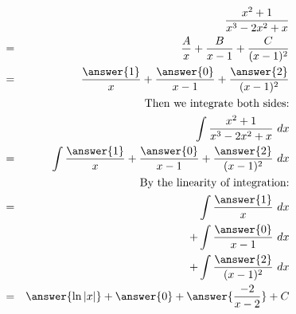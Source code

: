 \documentclass{ximera}
\begin{document}
\begin{explanation}
\begin{eqnarray*}
&&\frac{x^2+1}{x^3-2x^2+x}\\
&=& \frac{A}{x}+\frac{B}{x-1}+\frac{C}{(x-1)^2}\\
&=& \frac{\answer{1}}{x}+\frac{\answer{0}}{x-1}+\frac{\answer{2}}{(x-1)^2}\\
&&\text{Then we integrate both sides:}\\
&&\int \frac{x^2+1}{x^3-2x^2+x}\ dx \\
&=& \int \frac{\answer{1}}{x}+\frac{\answer{0}}{x-1}+\frac{\answer{2}}{(x-1)^2}\ dx\\
&&\text{By the linearity of integration:}\\
&=& \int \frac{\answer{1}}{x}\ dx \\ &&+\int \frac{\answer{0}}{x-1}\ dx\\ &&+\int\frac{\answer{2}}{(x-1)^2}\ dx\\
&=& \answer{\ln|x|}+\answer{0}+\answer{\frac{-2}{x-2}}+C
\end{eqnarray*}



\end{explanation}
\end{document}
